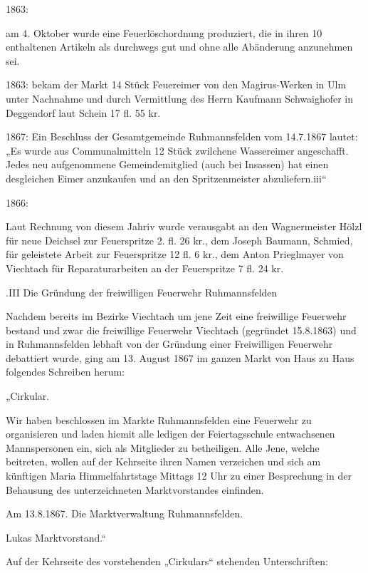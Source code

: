 \documentclass{book}
\begin{document}
1863:

am 4. Oktober wurde eine Feuerlöschordnung produziert, die in ihren 10
enthaltenen Artikeln als durchwegs gut und ohne alle Abänderung anzunehmen sei.

1863:   bekam der Markt 14 Stück Feuereimer von den Magirus-Werken in Ulm unter
Nachnahme und durch Vermittlung des Herrn Kaufmann Schwaighofer in Deggendorf
laut Schein 17 fl. 55 kr.

1867:   Ein Beschluss der Gesamtgemeinde Ruhmannsfelden vom 14.7.1867 lautet:
„Es wurde aus Communalmitteln 12 Stück zwilchene Wassereimer angeschafft. Jedes
neu aufgenommene Gemeindemitglied (auch bei Insassen) hat einen desgleichen
Eimer anzukaufen und an den Spritzenmeister abzuliefern.iii“

1866:

Laut Rechnung von diesem Jahriv wurde verausgabt an den Wagnermeister Hölzl für
neue Deichsel zur Feuerspritze 2. fl. 26 kr., dem Joseph Baumann, Schmied, für
geleistete Arbeit zur Feuerspritze 12 fl. 6 kr., dem Anton Prieglmayer von
Viechtach für Reparaturarbeiten an der Feuerspritze 7 fl. 24 kr.

.III Die Gründung der freiwilligen Feuerwehr Ruhmannsfelden

Nachdem bereits im Bezirke Viechtach um jene Zeit eine freiwillige Feuerwehr
bestand und zwar die freiwillige Feuerwehr Viechtach (gegründet 15.8.1863) und
in Ruhmannsfelden lebhaft von der Gründung einer Freiwilligen Feuerwehr
debattiert wurde, ging am 13. August 1867 im ganzen Markt von Haus zu Haus
folgendes Schreiben herum:



„Cirkular.



Wir haben beschlossen im Markte Ruhmannsfelden eine Feuerwehr zu organisieren
und laden hiemit alle ledigen der Feiertagsschule entwachsenen Mannspersonen
ein, sich als Mitglieder zu betheiligen. Alle Jene, welche beitreten, wollen auf
der Kehrseite ihren Namen verzeichen und sich am künftigen Maria
Himmelfahrtstage Mittags 12 Uhr zu einer Besprechung in der Behausung des
unterzeichneten Marktvorstandes einfinden.



Am 13.8.1867. Die Marktverwaltung Ruhmannsfelden.

Lukas Marktvorstand.“



Auf der Kehrseite des vorstehenden „Cirkulars“ stehenden Unterschriften:
\end{document}
